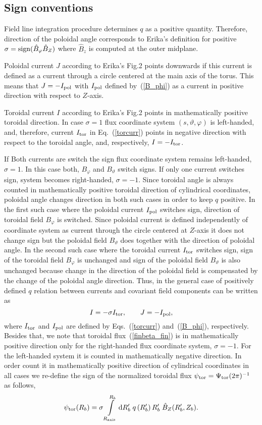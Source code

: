 \documentclass[12pt]{article}
\newcommand{\be}[1]{\begin{equation} \label{#1}}
\newcommand{\ee}{\end{equation}}
\newcommand{\eq}[1]{(\ref{#1})}
\newcommand{\rd}{{\rm d}}
\begin{document}
\subsection{Sign conventions}
\label{ssec:signs}

\noindent
Field line integration procedure determines $q$ as a positive quantity. Therefore, direction of the poloidal angle 
corresponds to Erika's definition for positive $\sigma={\rm sign}(\hat B_\varphi \hat B_Z)$ where $\hat B_z$ is 
computed at the outer midplane.

\noindent
Poloidal current $J$ according to Erika's Fig.2 points downwards if this current is defined as a current through a 
circle centered at the main axis of the torus. This means that $J=-I_{\rm pol}$ with $I_{\rm pol}$ defined 
by~\eq{B_phi} as a current in positive direction with respect to $Z$-axis.

\noindent
Toroidal current $I$ according to Erika's Fig.2 points in mathematically positive toroidal direction.
In case $\sigma=1$ flux coordinate system $(s,\vartheta,\varphi)$ is left-handed, and, therefore, current
$I_{\rm tor}$ in Eq.~\eq{torcurr} points in negative direction with respect to the toroidal angle, and, respectively,
$I=-I_{\rm tor}$.

\noindent
If Both currents are switch the sign flux coordinate system remains left-handed, $\sigma=1$. In this case both, $B_\varphi$
and $B_\vartheta$ switch signs. If only one current switches sign, system becomes right-handed, $\sigma=-1$. Since 
toroidal angle is always counted in mathematically positive toroidal direction of cylindrical coordinates, poloidal 
angle changes direction in both such cases in order to keep $q$ positive. 
In the first such case where the poloidal current $I_{\rm pol}$ switches sign, direction of toroidal field $B_\varphi$
is switched. Since poloidal current is defined independently of coordinate system as current through the circle centered
at $Z$-axis it does not change sign but the poloidal field $B_\vartheta$ does together with the direction
of poloidal angle. In the second such case where the toroidal current $I_{\rm tor}$ switches sign, sign of the
toroidal field $B_\varphi$ is unchanged and sign of the poloidal field $B_\vartheta$ is also unchanged because
change in the direction of the poloidal field is compensated by the change of the poloidal angle direction.
Thus, in the general case of positively defined $q$ relation between currents and covariant field components can
be written as
\be{relcurfield}
I=-\sigma I_{\rm tor}, \qquad J=-I_{\rm pol},
\ee
where $I_{\rm tor}$ and $I_{\rm pol}$ are defined by Eqs.~\eq{torcurr} and~\eq{B_phi}, respectively.
Besides that, we note that toroidal flux~\eq{finbeta_fin} is in mathematically positive direction
only for the right-handed flux coordinate system, $\sigma=-1$. For the left-handed system it is counted
in mathematically negative direction. In order count it in mathematically positive direction of
cylindrical coordinates in all cases we re-define the sign of the normalized toroidal flux
$\psi_{\rm tor}=\Psi_{\rm tor}(2\pi)^{-1}$ as follows,
\be{finbeta_fin_sigma}
\psi_{\rm tor}(R_b)
= \sigma \int\limits_{R_{\rm axis}}^{R_b} \rd R_b^\prime\; q\left(R_b^\prime\right) R_b^\prime\;\hat B_Z(R_b^\prime,Z_b).
\ee
\end{document}
